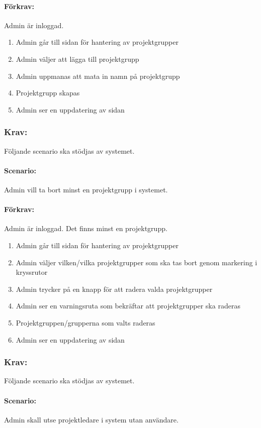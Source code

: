 \documentclass[paper=a4, fontsize=11pt,twoside]{article}
\begin{document}
\paragraph{Förkrav:}
Admin är inloggad.
\begin{enumerate}
\item Admin går till sidan för hantering av projektgrupper
\item Admin väljer att lägga till projektgrupp
\item Admin uppmanas att mata in namn på projektgrupp
\item Projektgrupp skapas
\item Admin ser en uppdatering av sidan
\end{enumerate}

\subsubsection{Krav:} 
Följande scenario ska stödjas av systemet.
\paragraph{Scenario:}
Admin vill ta bort minst en projektgrupp i systemet.
\paragraph{Förkrav:}
Admin är inloggad. Det finns minst en projektgrupp.
\begin{enumerate}
\item Admin går till sidan för hantering av projektgrupper
\item Admin väljer vilken/vilka projektgrupper som ska tas bort genom markering i kryssrutor
\item Admin trycker på en knapp för att radera valda projektgrupper
\item Admin ser en varningsruta som bekräftar att projektgrupper ska raderas
\item Projektgruppen/grupperna som valts raderas
\item Admin ser en uppdatering av sidan
\end{enumerate}

\subsubsection{Krav:} Följande scenario ska stödjas av systemet. 
\paragraph{Scenario:}
Admin skall utse projektledare i system utan användare.
\end{document}
